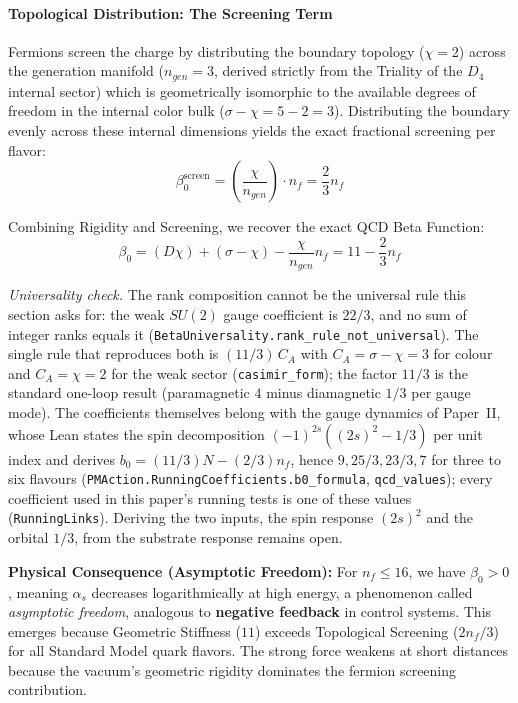 \paragraph{Topological Distribution: The Screening Term}
Fermions screen the charge by distributing the boundary topology ($\chi=2$) across the generation manifold ($n_{gen}=3$, derived strictly from the Triality of the $D_4$ internal sector) which is geometrically isomorphic to the available degrees of freedom in the internal color bulk ($\sigma - \chi = 5 - 2 = 3$). Distributing the boundary evenly across these internal dimensions yields the exact fractional screening per flavor:
\begin{equation}
    \beta_0^{\text{screen}} = \left( \frac{\chi}{n_{gen}} \right) \cdot n_f = \frac{2}{3} n_f
\end{equation}

Combining Rigidity and Screening, we recover the exact QCD Beta Function:
\begin{equation} \label{eq:beta_qcd}
    \beta_0 = (D\chi) + (\sigma-\chi) - \frac{\chi}{n_{gen}} n_f = 11 - \frac{2}{3}n_f
\end{equation}

\textit{Universality check.} The rank composition cannot be the universal rule this section asks for: the weak $SU(2)$ gauge coefficient is $22/3$, and no sum of integer ranks equals it (\texttt{BetaUniversality.rank\_rule\_not\_universal}). The single rule that reproduces both is $(11/3)\,C_A$ with $C_A=\sigma-\chi=3$ for colour and $C_A=\chi=2$ for the weak sector (\texttt{casimir\_form}); the factor $11/3$ is the standard one-loop result (paramagnetic $4$ minus diamagnetic $1/3$ per gauge mode). The coefficients themselves belong with the gauge dynamics of Paper~II, whose Lean states the spin decomposition $(-1)^{2s}((2s)^2-1/3)$ per unit index and derives $b_0=(11/3)N-(2/3)n_f$, hence $9,25/3,23/3,7$ for three to six flavours (\texttt{PMAction.RunningCoefficients.b0\_formula}, \texttt{qcd\_values}); every coefficient used in this paper's running tests is one of these values (\texttt{RunningLinks}). Deriving the two inputs, the spin response $(2s)^2$ and the orbital $1/3$, from the substrate response remains open.

\textbf{Physical Consequence (Asymptotic Freedom):} For $n_f \leq 16$, we have $\beta_0 > 0$, meaning $\alpha_s$ decreases logarithmically at high energy, a phenomenon called \textit{asymptotic freedom}, analogous to \textbf{negative feedback} in control systems. This emerges because Geometric Stiffness ($11$) exceeds Topological Screening ($2n_f/3$) for all Standard Model quark flavors. The strong force weakens at short distances because the vacuum's geometric rigidity dominates the fermion screening contribution.

